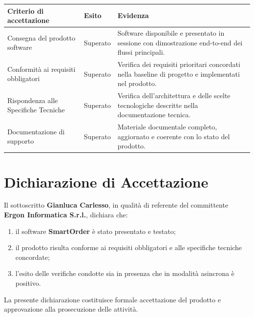 \documentclass[a4paper, 11pt, oneside]{scrartcl}
\begin{document}
\footnotesize
\setlength{\tabcolsep}{5pt}
\begin{tabularx}{\textwidth}{p{} p{} X}
\toprule
\textbf{Criterio di accettazione} & \textbf{Esito} & \textbf{Evidenza} \\
\midrule
Consegna del prodotto software & Superato & Software disponibile e presentato in sessione con dimostrazione end-to-end dei flussi principali. \\
\addlinespace
Conformità ai requisiti obbligatori & Superato & Verifica dei requisiti prioritari concordati nella baseline di progetto e implementati nel prodotto. \\
\addlinespace
Rispondenza alle Specifiche Tecniche & Superato & Verifica dell'architettura e delle scelte tecnologiche descritte nella documentazione tecnica. \\
\addlinespace
Documentazione di supporto & Superato & Materiale documentale completo, aggiornato e coerente con lo stato del prodotto. \\
\bottomrule
\end{tabularx}
\normalsize

\newpage
\section{Dichiarazione di Accettazione}
Il sottoscritto \textbf{Gianluca Carlesso}, in qualità di referente del committente \textbf{Ergon Informatica S.r.l.}, dichiara che:

\begin{enumerate}[label=\arabic*.]
    \item il software \textbf{SmartOrder} è stato presentato e testato;
    \item il prodotto risulta conforme ai requisiti obbligatori e alle specifiche tecniche concordate;
    \item l'esito delle verifiche condotte sia in presenza che in modalità asincrona è positivo.
\end{enumerate}

La presente dichiarazione costituisce formale accettazione del prodotto e approvazione alla prosecuzione delle attività.

\end{document}
